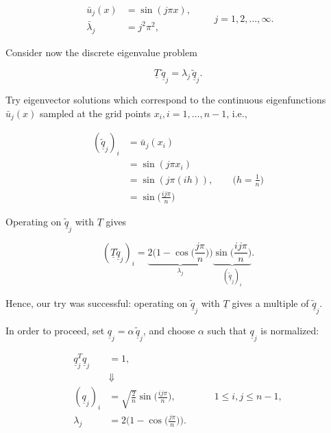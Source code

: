 \documentclass[11pt]{article}
\begin{document}
\begin{equation*}
  \begin{split}
    \bar{u}_j(x) &= \sin(j \pi x), \\
    \bar{\lambda}_j &= j^2 \pi^2,
  \end{split}
  \qquad j=1,2,\ldots,\infty.
\end{equation*}

Consider now the discrete eigenvalue problem

\begin{equation*}
  \underline{{T}} \,\underline{\widetilde{q}}_j = 
  \lambda_j \,\underline{\widetilde{q}}_j.
\end{equation*}

Try eigenvector solutions which correspond to the 
continuous eigenfunctions $\bar{u}_j(x)$ sampled at the grid points 
$x_i, i=1,\ldots,n-1$, i.e., 

\begin{equation*}
  \begin{split}
    (\underline{\widetilde{q}}_j)_i &= \bar{u}_j (x_i) \\
    &= \sin(j \pi x_i) \\
    &= \sin(j \pi (i h)), \qquad \biggl(h=\frac{1}{n} \biggr) \\
    &= \sin \biggl(\frac{i j \pi}{n} \biggr) 
  \end{split}
\end{equation*}

Operating on $\underline{\widetilde{q}}_j$ with $\underline{{T}}$ gives

\begin{equation*}
  (\underline{{T}} \underline{\widetilde{q}}_j)_i = \underset{\lambda_j}{\underbrace{2 \biggl(1-\cos \biggl( \frac{j \pi}{n} \biggr) \biggr) }} \underset{(\underline{\widetilde{q}}_j)_i}{\underbrace{\sin \biggl( \frac{ij \pi}{n}\biggr)}}.
\end{equation*}

Hence, our try was successful: operating on $\underline{\widetilde{q}}_j$ with $\underline{{T}}$ gives a multiple of $\underline{\widetilde{q}}_j$.

\newpage
In order to proceed, set $\underline{q}_j = \alpha \,\underline{\widetilde{q}}_j$, and choose $\alpha$ such that $\underline{q}_j$ is normalized:

\begin{align*}
  \underline{q}_j^T \underline{q}_j &= 1, \\
  & \Downarrow \\
  (\underline{q}_j)_i &= \sqrt{\frac{2}{n}} \sin \biggl( \frac{ij \pi}{n} \biggr), \qquad \qquad 1 \leq i,j \leq n-1, \\
  \lambda_j &= 2 \biggl( 1 - \cos \biggl( \frac{j \pi}{n} \biggr) \biggr). 
\end{align*}
\end{document}
